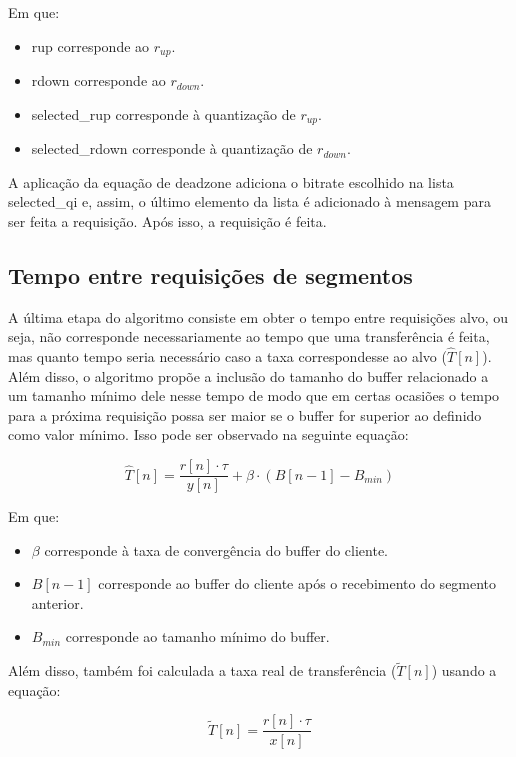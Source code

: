 \documentclass[10pt,twocolumn,letterpaper]{article}
\begin{document}
	Em que:
	\begin{itemize}
		\item rup corresponde ao $r_{up}$.
		\item rdown corresponde ao $r_{down}$.
		\item selected\_rup corresponde à quantização de $r_{up}$.
		\item selected\_rdown corresponde à quantização de $r_{down}$.
	\end{itemize}
	
	A aplicação da equação de deadzone adiciona o bitrate escolhido na lista selected\_qi e, assim, o último elemento da lista é adicionado à mensagem para ser feita a requisição. Após isso, a requisição é feita.
	
	\subsection{Tempo entre requisições de segmentos}
	A última etapa do algoritmo consiste em obter o tempo entre requisições alvo, ou seja, não corresponde necessariamente ao tempo que uma transferência é feita, mas quanto tempo seria necessário caso a taxa correspondesse ao alvo ($\hat{T}[n]$). Além disso, o algoritmo propõe a inclusão do tamanho do buffer relacionado a um tamanho mínimo dele nesse tempo de modo que em certas ocasiões o tempo para a próxima requisição possa ser maior se o buffer for superior ao definido como valor mínimo. Isso pode ser observado na seguinte equação:
	
	\begin{equation}
		\hat{T}[n] = \frac{r[n] \cdot \tau}{y[n]} + \beta \cdot (B[n-1] - B_{min})
	\end{equation}
	
	Em que:
	\begin{itemize}
		\item $\beta$ corresponde à taxa de convergência do buffer do cliente.
		\item $B[n-1]$ corresponde ao buffer do cliente após o recebimento do segmento anterior.
		\item $B_{min}$ corresponde ao tamanho mínimo do buffer.
	\end{itemize}
	
	Além disso, também foi calculada a taxa real de transferência ($\tilde{T}[n]$) usando a equação:
	
	\begin{equation}
		\tilde{T}[n] = \frac{r[n] \cdot \tau}{x[n]}
	\end{equation}
	
\end{document}
